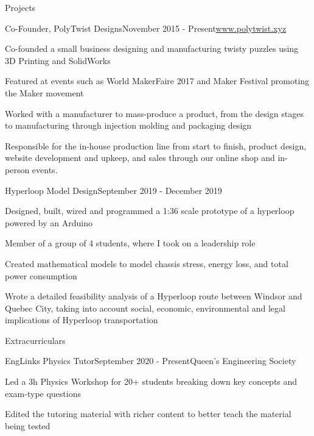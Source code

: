 \documentclass{resume} %
\begin{document}
\begin{rSection}{Projects}

\begin{rSubsection}{Co-Founder, PolyTwist Designs}{November 2015 - Present}{\url{www.polytwist.xyz}}{}
\item Co-founded a small business designing and manufacturing twisty puzzles using 3D Printing and SolidWorks
\item Featured at events such as World MakerFaire 2017 and Maker Festival promoting the Maker movement
\item Worked with a manufacturer to mass-produce a product, from the design stages to manufacturing through injection molding and packaging design
\item Responsible for the in-house production line from start to finish, product design, website development and upkeep, and sales through our online shop and in-person events.
\end{rSubsection}

\begin{rSubsection}{Hyperloop Model Design}{September 2019 - December 2019}{}{}
\item Designed, built, wired and programmed a 1:36 scale prototype of a hyperloop powered by an Arduino
\item Member of a group of 4 students, where I took on a leadership role
\item Created mathematical models to model chassis stress, energy loss, and total power consumption
\item Wrote a detailed feasibility analysis of a Hyperloop route between Windsor and Quebec City, taking into account social, economic, environmental and legal implications of Hyperloop transportation
\end{rSubsection}


\end{rSection}



\begin{rSection}{Extracurriculars}
\begin{rSubsection}{EngLinks Physics Tutor}{September 2020 - Present}{Queen's Engineering Society}{}
\item Led a 3h Physics Workshop for 20+ students breaking down key concepts and exam-type questions
\item Edited the tutoring material with richer content to better teach the material being tested

\end{rSubsection}

\end{rSection}
\end{document}
